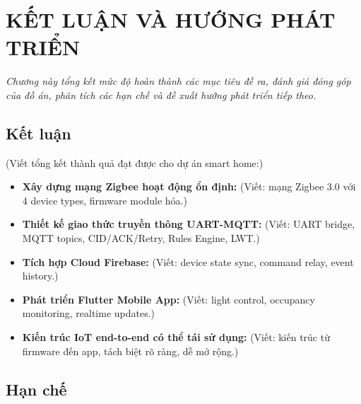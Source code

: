 \chapter{KẾT LUẬN VÀ HƯỚNG PHÁT TRIỂN}
\label{ch:ketluan}

\vspace{0.5cm}
\noindent\textit{Chương này tổng kết mức độ hoàn thành các mục tiêu đề ra, đánh giá đóng góp của đồ án, phân tích các hạn chế và đề xuất hướng phát triển tiếp theo.}
\vspace{0.5cm}

\section{Kết luận}
\label{sec:ch5-ketluan}

(Viết tổng kết thành quả đạt được cho dự án smart home:)

\begin{itemize}
    \item \textbf{Xây dựng mạng Zigbee hoạt động ổn định:} (Viết: mạng Zigbee 3.0 với 4 device types, firmware module hóa.)
    \item \textbf{Thiết kế giao thức truyền thông UART-MQTT:} (Viết: UART bridge, MQTT topics, CID/ACK/Retry, Rules Engine, LWT.)
    \item \textbf{Tích hợp Cloud Firebase:} (Viết: device state sync, command relay, event history.)
    \item \textbf{Phát triển Flutter Mobile App:} (Viết: light control, occupancy monitoring, realtime updates.)
    \item \textbf{Kiến trúc IoT end-to-end có thể tái sử dụng:} (Viết: kiến trúc từ firmware đến app, tách biệt rõ ràng, dễ mở rộng.)
\end{itemize}

\section{Hạn chế}
\label{sec:ch5-hanche}

